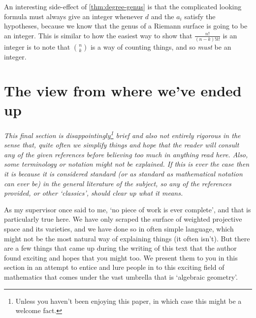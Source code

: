 \documentclass[10pt,notitlepage]{article}
\makeatletter
\newcommand{\draftwatermarkoff}{%
  \let\sc@watermark\@empty
}
\numberwithin{equation}{subsection}
\makeatother
\begin{document}
            An interesting side-effect of \cref{thm:degree-genus} is that the complicated looking formula must always give an integer whenever $d$ and the $a_i$ satisfy the hypotheses, because we know that the genus of a Riemann surface is going to be an integer.
            This is similar to how the easiest way to show that $\frac{n!}{(n-k)!k!}$ is an integer is to note that $\binom{n}{k}$ is a way of counting things, and so \emph{must} be an integer.
        







\section{The view from where we've ended up} %
\label{sec:the_view_from_where_we_ve_got_to}
\draftwatermarkoff

    \emph{This final section is disappointingly\footnote{%
            Unless you haven't been enjoying this paper, in which case this might be a welcome fact.
        } brief and also not entirely rigorous in the sense that, quite often we simplify things and hope that the reader will consult any of the given references before believing too much in anything read here.
        Also, some terminology or notation might not be explained.
        If this is ever the case then it is because it is considered standard (or as standard as mathematical notation can ever be) in the general literature of the subject, so any of the references provided, or other `classics', should clear up what it means.}

    \bigskip

    As my supervisor once said to me, `no piece of work is ever complete', and that is particularly true here.
    We have only scraped the surface of weighted projective space and its varieties, and we have done so in often simple language, which might not be the most natural way of explaining things (it often isn't).
    But there are a few things that came up during the writing of this text that the author found exciting and hopes that you might too.
    We present them to you in this section in an attempt to entice and lure people in to this exciting field of mathematics that comes under the vast umbrella that is `algebraic geometry'.
\end{document}
